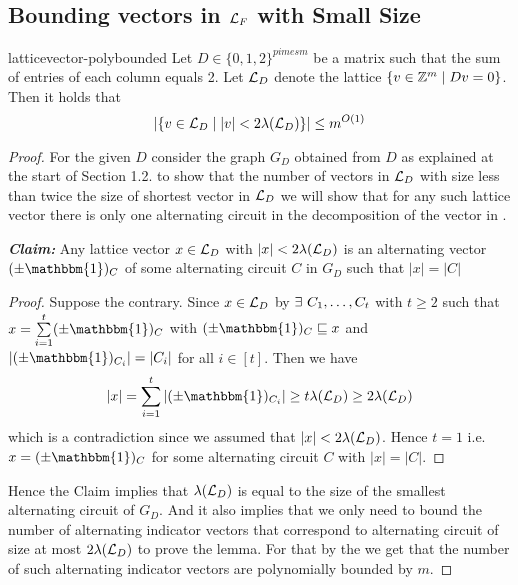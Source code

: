 \subsection{Bounding vectors in \texorpdfstring{$\mathcal{L}_F$}{Lf} with Small Size}
\begin{Theorem}{\cite{GurjarOkiRaj_2024_Flm}}{latticevector-polybounded}
	Let $D\in \{0,1,2\}^{pimes m}$ be a matrix such that the sum of entries of each column equals 2. Let $\mathcal{L}_D$ denote the lattice $\{v\in\mathbb{Z}^m\mid Dv=0\}$. Then it holds that $$|\{v\in \mathcal{L}_D\mid |v|<2\lambda(\mathcal{L}_D)\}|\leq m^{O(1)}$$
\end{Theorem}
\begin{proof}
	For the given $D$ consider the graph $G_D$ obtained from $D$ as explained at the start of Section 1.2. to show that the number of  vectors in $\mathcal{L}_D$ with size less than twice the size of shortest vector in $\mathcal{L}_D$ we will show that for any such lattice vector there is only one alternating circuit in the decomposition of the vector in .\parinf\vspace*{5mm}

	\textbf{\textit{Claim:}} Any lattice vector $x\in \mathcal{L}_D$ with $|x|<2\lambda(\mathcal{L}_D)$ is an alternating vector $(\pm\mathbbm{1})_C$ of some alternating circuit $C$ in $G_D$ such that $|x|=|C|$

	\begin{proof}
		Suppose the contrary. Since $x\in \mathcal{L}_D$ by  $\exists\ C_1,\dots, C_t$ with $t\geq 2$ such that $x=\sum\limits_{i=1}^t (\pm\mathbbm{1})_C$ with $(\pm \mathbbm{1})_C\sqsubseteq x$ and $|(\pm \mathbbm{1})_{C_i}|=|C_i|$ for all $i\in[t]$. Then we have $$|x|=\sum_{i=1}^t|(\pm \mathbbm{1})_{C_i}|\geq t\lm(\mcL_D)\geq 2\lm(\mcL_D)$$which is a contradiction since we assumed that $|x|<2\lambda(\mathcal{L}_D)$. Hence $t=1$ i.e. $x=(\pm\mathbbm{1})_C$ for some alternating circuit $C$ with $|x|=|C|$.
	\end{proof}
	\vspace*{5mm}

	Hence the Claim implies that $\lambda(\mathcal{L}_D)$ is equal to the size of the smallest alternating circuit of $G_D$. And it also implies that we only need to bound the number of alternating indicator vectors that correspond to alternating circuit of size at most $2\lambda(\mathcal{L}_D)$ to prove the lemma. For that by the  we get that the number of such alternating indicator vectors are polynomially bounded by $m$.
\end{proof}

